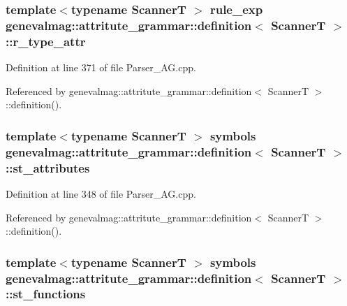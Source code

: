 \hypertarget{structgenevalmag_1_1attritute__grammar_1_1definition_af26439d1c38aa5832b576e5dff033cdb}{
\subsubsection[{r\_\-type\_\-attr}]{\setlength{\rightskip}{0pt plus 5cm}template$<$typename ScannerT $>$ {\bf rule\_\-exp} {\bf genevalmag::attritute\_\-grammar::definition}$<$ ScannerT $>$::{\bf r\_\-type\_\-attr}}}
\label{structgenevalmag_1_1attritute__grammar_1_1definition_af26439d1c38aa5832b576e5dff033cdb}


Definition at line 371 of file Parser\_\-AG.cpp.



Referenced by genevalmag::attritute\_\-grammar::definition$<$ ScannerT $>$::definition().

\hypertarget{structgenevalmag_1_1attritute__grammar_1_1definition_a657fac5b2a9e5b6c41fad89903fc1e78}{
\subsubsection[{st\_\-attributes}]{\setlength{\rightskip}{0pt plus 5cm}template$<$typename ScannerT $>$ symbols {\bf genevalmag::attritute\_\-grammar::definition}$<$ ScannerT $>$::{\bf st\_\-attributes}}}
\label{structgenevalmag_1_1attritute__grammar_1_1definition_a657fac5b2a9e5b6c41fad89903fc1e78}


Definition at line 348 of file Parser\_\-AG.cpp.



Referenced by genevalmag::attritute\_\-grammar::definition$<$ ScannerT $>$::definition().

\hypertarget{structgenevalmag_1_1attritute__grammar_1_1definition_a5d1b5fa3e7dfd54784f7f52c100fdca7}{
\subsubsection[{st\_\-functions}]{\setlength{\rightskip}{0pt plus 5cm}template$<$typename ScannerT $>$ symbols {\bf genevalmag::attritute\_\-grammar::definition}$<$ ScannerT $>$::{\bf st\_\-functions}}}
\label{structgenevalmag_1_1attritute__grammar_1_1definition_a5d1b5fa3e7dfd54784f7f52c100fdca7}


